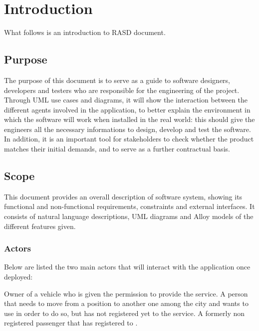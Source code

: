 \section{Introduction}	%
What follows is an introduction to \myTaxiService{} RASD document.
\subsection{Purpose}
The purpose of this document is to serve as a guide to software designers, developers and testers who are responsible for the engineering of the \myTaxiService{} project.
Through UML use cases and diagrams, it will show the interaction between the different agents involved in the application, to better explain the environment in which the software will work when installed in the real world: this should give the engineers all the necessary informations to design, develop and test the software.
In addition, it is an important tool for stakeholders to check whether the product matches their initial demands, and to serve as a further contractual basis.
\subsection{Scope}
This document provides an overall description of \myTaxiService{} software system, showing its functional and non-functional requirements, constraints and external interfaces.
It consists of natural language descriptions, UML diagrams and Alloy models of the different features given.
\subsubsection{Actors}
Below are listed the two main actors that will interact with the application once deployed:
\begin{itemize}
		Owner of a vehicle who is given the permission to provide the service.
	 A person that needs to move from a position to another one among the city and wants to use \myTaxiService{} in order to do so, but has not registered yet to the service.
	 A formerly non registered passenger that has registered to \myTaxiService{}.
\end{itemize}
